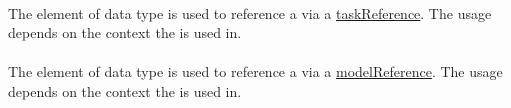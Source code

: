\paragraph*{}
\label{sec:taskReferenceAttribute}
The  element of data type \SIdRef is used to reference a \Task via a \hyperref[sec:taskReference]{taskReference}. The usage depends on the context the \Variable is used in.

\paragraph*{}
\label{sec:modelReferenceAttribute}
The  element of data type \SIdRef is used to reference a \Model via a \hyperref[sec:modelReference]{modelReference}. The usage depends on the context the \Variable is used in.


